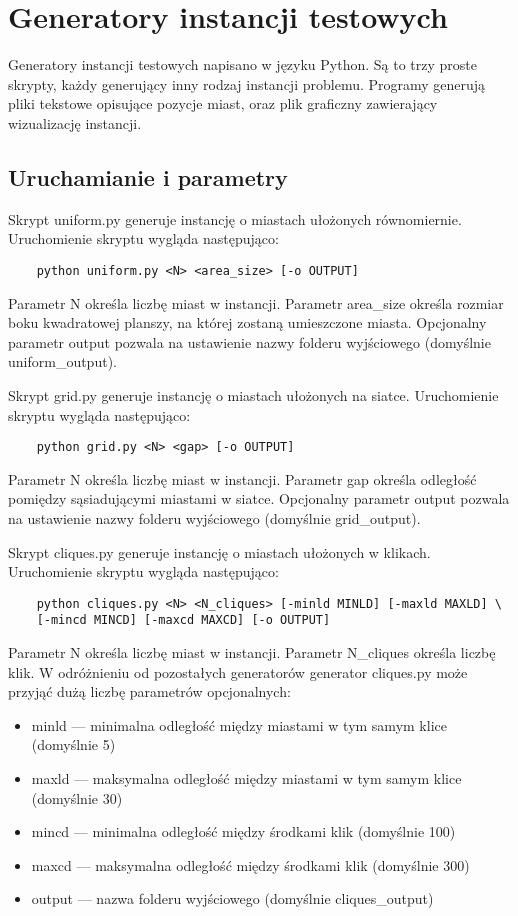 \section{Generatory instancji testowych}

Generatory instancji testowych napisano w języku Python.
Są to trzy proste skrypty, każdy generujący inny rodzaj instancji problemu.
Programy generują pliki tekstowe opisujące pozycje miast, oraz plik graficzny zawierający wizualizację instancji.

\subsection{Uruchamianie i parametry}
Skrypt uniform.py generuje instancję o miastach ułożonych równomiernie.
Uruchomienie skryptu wygląda następująco:
\begin{lstlisting}
    python uniform.py <N> <area_size> [-o OUTPUT]
\end{lstlisting}
Parametr N określa liczbę miast w instancji. Parametr area\_size określa rozmiar boku kwadratowej planszy, na której zostaną umieszczone miasta.
Opcjonalny parametr output pozwala na ustawienie nazwy folderu wyjściowego (domyślnie uniform\_output).

Skrypt grid.py generuje instancję o miastach ułożonych na siatce.
Uruchomienie skryptu wygląda następująco:
\begin{lstlisting}
    python grid.py <N> <gap> [-o OUTPUT]
\end{lstlisting}
Parametr N określa liczbę miast w instancji. Parametr gap określa odległość pomiędzy sąsiadującymi miastami w siatce.
Opcjonalny parametr output pozwala na ustawienie nazwy folderu wyjściowego (domyślnie grid\_output).

Skrypt cliques.py generuje instancję o miastach ułożonych w klikach.
Uruchomienie skryptu wygląda następująco:
\begin{lstlisting}
    python cliques.py <N> <N_cliques> [-minld MINLD] [-maxld MAXLD] \ 
    [-mincd MINCD] [-maxcd MAXCD] [-o OUTPUT]
\end{lstlisting}
Parametr N określa liczbę miast w instancji. Parametr N\_cliques określa liczbę klik.
W odróżnieniu od pozostałych generatorów generator cliques.py może przyjąć dużą liczbę parametrów opcjonalnych:
\begin{itemize}
    \item minld --- minimalna odległość między miastami w tym samym klice (domyślnie 5)
    \item maxld --- maksymalna odległość między miastami w tym samym klice (domyślnie 30)
    \item mincd --- minimalna odległość między środkami klik (domyślnie 100)
    \item maxcd --- maksymalna odległość między środkami klik (domyślnie 300)
    \item output --- nazwa folderu wyjściowego (domyślnie cliques\_output)
\end{itemize}

